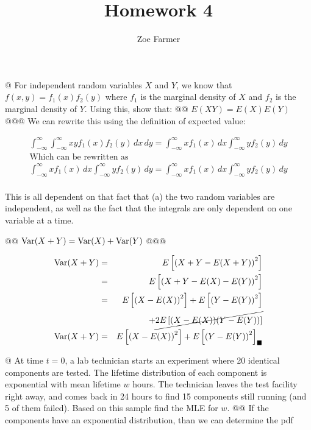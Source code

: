 \documentclass[10pt]{article}
\title{Homework 4}
\author{Zoe Farmer}
\begin{document}
\maketitle

\begin{easylist}[enumerate]
    @ For independent random variables $X$ and $Y$, we know that $f(x,y)=f_1(x) f_2(y)$ where $f_1$ is the marginal
    density of $X$ and $f_2$ is the marginal density of $Y$. Using this, show that:
    @@ $E(XY) = E(X)E(Y)$
    @@@ We can rewrite this using the definition of expected value:

    \[
        \begin{aligned}
            \int^\infty_{-\infty}\int^\infty_{-\infty} xy f_1(x) f_2(y) \, dx \, dy =
            \int_{-\infty}^\infty x f_1(x) \, dx \int_{-\infty}^\infty y f_2(y) \, dy\\
            \text{Which can be rewritten as}\\
            \int_{-\infty}^\infty x f_1(x) \, dx \int_{-\infty}^\infty y f_2(y) \, dy =
            \int_{-\infty}^\infty x f_1(x) \, dx \int_{-\infty}^\infty y f_2(y) \, dy\\
        \end{aligned}
    \]

    This is all dependent on that fact that (a) the two random variables are independent, as well as the fact that the
    integrals are only dependent on one variable at a time.

    @@ $\text{Var}(X + Y) = \text{Var}(X) + \text{Var}(Y)$
    @@@ 

    \[
        \begin{aligned}
            \text{Var}(X + Y) &=& E\left[ {\left( X + Y - E(X + Y) \right)}^2 \right]\\
                    &=& E \left[ {\left( X + Y - E(X) - E(Y) \right)}^2 \right]\\
                    &=& E \left[ {\left( X - E(X) \right)}^2 \right] + E \left[ {\left( Y - E(Y) \right)}^2 \right]\\
                    & & + \cancel{2 E \left[ {\left( X - E(X) \right)}{\left( Y - E(Y) \right)} \right]}\\
                    \text{Var}(X + Y) &=& {E\left[ {\left( X - E(X) \right)}^2\right] + E\left[ {\left( Y - E(Y)
                    \right)}^2\right]}_\blacksquare
        \end{aligned}
    \]

    @ At time $t=0$, a lab technician starts an experiment where 20 identical components are tested. The lifetime
    distribution of each component is exponential with mean lifetime $w$ hours. The technician leaves the test facility
    right away, and comes back in 24 hours to find 15 components still running (and 5 of them failed). Based on this
    sample find the MLE for $w$.
    @@ If the components have an exponential distribution, than we can determine the pdf


\end{easylist}
\end{document}
